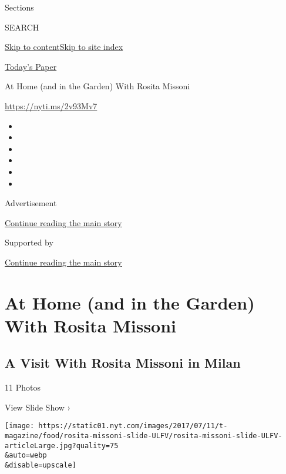 Sections

SEARCH

\protect\hyperlink{site-content}{Skip to
content}\protect\hyperlink{site-index}{Skip to site index}

\href{https://myaccount.nytimes.com/auth/login?response_type=cookie\&client_id=vi}{}

\href{https://www.nytimes.com/section/todayspaper}{Today's Paper}

At Home (and in the Garden) With Rosita Missoni

\href{https://nyti.ms/2v93Mv7}{https://nyti.ms/2v93Mv7}

\begin{itemize}
\item
\item
\item
\item
\item
\item
\end{itemize}

Advertisement

\protect\hyperlink{after-top}{Continue reading the main story}

Supported by

\protect\hyperlink{after-sponsor}{Continue reading the main story}

\hypertarget{at-home-and-in-the-garden-with-rosita-missoni}{%
\section{At Home (and in the Garden) With Rosita
Missoni}\label{at-home-and-in-the-garden-with-rosita-missoni}}

\href{https://www.nytimes.com/slideshow/2017/07/11/t-magazine/food/a-visit-with-rosita-missoni-in-milan.html}{}

\hypertarget{a-visit-with-rosita-missoni-in-milan}{%
\subsection{A Visit With Rosita Missoni in
Milan}\label{a-visit-with-rosita-missoni-in-milan}}

11 Photos

View Slide Show ›

\texttt{[image: https://static01.nyt.com/images/2017/07/11/t-magazine/food/rosita-missoni-slide-ULFV/rosita-missoni-slide-ULFV-articleLarge.jpg?quality=75\\\&auto=webp\\\&disable=upscale]}

